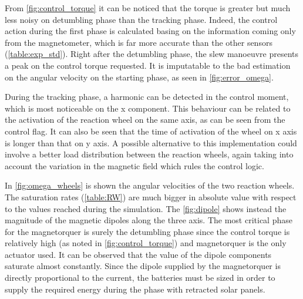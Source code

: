 
From \autoref{fig:control_torque} it can be noticed that the torque is greater but much less noisy on detumbling phase than the tracking phase. Indeed, the control action during the first phase is calculated basing on the information coming only from the magnetometer, which is far more accurate than the other sensors (\autoref{table:exp_std}). Right after the detumbling phase, the slew manoeuvre presents a peak on the control torque requested. It is imputatable to the bad estimation on the angular velocity on the starting phase, as seen in \autoref{fig:error_omega}.

During the tracking phase, a harmonic can be detected in the control moment, which is most noticeable on the x component. This behaviour can be related to the activation of the reaction wheel on the same axis, as can be seen from the control flag. It can also be seen that the time of activation of the wheel on x axis is longer than that on y axis. A possible alternative to this implementation could involve a better load distribution between the reaction wheels, again taking into account the variation in the magnetic field which rules the control logic.


In \autoref{fig:omega_wheels} is shown the angular velocities of the two reaction wheels. The saturation rates (\autoref{table:RW}) are much bigger in absolute value with respect to the values reached during the simulation.
The \autoref{fig:dipole} shows instead the magnitude of the magnetic dipoles along the three axis. The most critical phase for the magnetorquer is surely the detumbling phase since the control torque is relatively high (as noted in \autoref{fig:control_torque}) and magnetorquer is the only actuator used.
It can be observed that the value of the dipole components saturate almost constantly. Since the dipole supplied by the magnetorquer is directly proportional to the current, the batteries must be sized in order to supply the required energy during the phase with retracted solar panels.